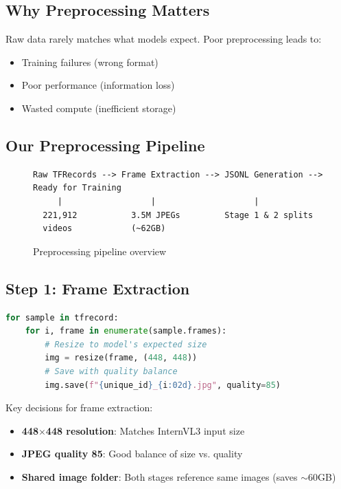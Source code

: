\documentclass[11pt,a4paper]{article}
\begin{document}
\subsection{Why Preprocessing Matters}

Raw data rarely matches what models expect. Poor preprocessing leads to:
\begin{itemize}
    \item Training failures (wrong format)
    \item Poor performance (information loss)
    \item Wasted compute (inefficient storage)
\end{itemize}

\subsection{Our Preprocessing Pipeline}

\begin{figure}[H]
\centering
\begin{tcolorbox}[colback=white,colframe=anthropicblue,width=\textwidth]
\begin{verbatim}
Raw TFRecords --> Frame Extraction --> JSONL Generation --> Ready for Training
     |                  |                    |
  221,912           3.5M JPEGs         Stage 1 & 2 splits
  videos            (~62GB)
\end{verbatim}
\end{tcolorbox}
\caption{Preprocessing pipeline overview}
\end{figure}

\subsection{Step 1: Frame Extraction}

\begin{lstlisting}[language=Python,caption=Frame extraction pseudocode]
for sample in tfrecord:
    for i, frame in enumerate(sample.frames):
        # Resize to model's expected size
        img = resize(frame, (448, 448))
        # Save with quality balance
        img.save(f"{unique_id}_{i:02d}.jpg", quality=85)
\end{lstlisting}

\begin{tipbox}
Key decisions for frame extraction:
\begin{itemize}
    \item \textbf{448$\times$448 resolution}: Matches InternVL3 input size
    \item \textbf{JPEG quality 85}: Good balance of size vs. quality
    \item \textbf{Shared image folder}: Both stages reference same images (saves $\sim$60GB)
\end{itemize}
\end{tipbox}
\end{document}
